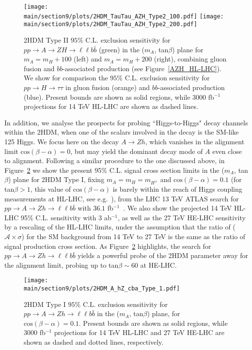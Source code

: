 \begin{figure}[h!]
\begin{center}
\texttt{[image: \\main/section9/plots/2HDM\_TauTau\_AZH\_Type2\_100.pdf]}
\hspace{3mm}
\texttt{[image: \\main/section9/plots/2HDM\_TauTau\_AZH\_Type2\_200.pdf]}
\caption{\small 2HDM Type II $95\%$ C.L. exclusion sensitivity for $p p \to A \to Z H \to \ell\ell b \bar{b}$  (green)
in the ($m_{A}$, tan$\beta$) plane for $m_A = m_H +100$ \UGeV (left) and $m_A = m_H +200$ \UGeV (right), combining 
gluon fusion and $bb$-associated production (see Figure~\ref{AZH_HL-LHC}). We show for comparison
the $95\%$ C.L. exclusion sensitivity for $p p \to H \to \tau\tau$ in gluon fusion (orange) 
and $bb$-associated production (blue). Present bounds are shown as solid regions, while $3000$ fb$^{-1}$ projections for 14 TeV HL-LHC are shown as dashed lines.}
\label{TauTau_AZH_HL-HE}
\end{center}
\end{figure}

In addition, we analyse the prospects for probing ``Higgs-to-Higgs" decay channels within the 2HDM, when one of the scalars involved in the decay is the SM-like 125 \UGeV Higgs. We focus here on the decay $A \to Z h$, which vanishes in the alignment limit $\mathrm{cos}(\beta - \alpha) = 0$, but may yield the dominant decay mode of $A$ even close to alignment. Following a similar procedure to the one discussed above, in Figure~\ref{A_hZ_HL-HE} we show the present 95$\%$ C.L. signal cross section limits in the ($m_{A}$, tan$\beta$) plane for 2HDM Type I, fixing $m_A = m_H = m_{H^{\pm}}$ and $\mathrm{cos}(\beta-\alpha) = 0.1$ (for tan$\beta > 1$, this value of $\mathrm{cos}(\beta-\alpha)$ is barely within the reach of Higgs coupling measurements at HL-LHC, see e.g.~\cite{ATL-PHYS-PUB-2014-017}), from the LHC 13 TeV ATLAS search for $p p \to A \to Z h \to \ell\ell b \bar{b}$ with $36.1$ fb$^{-1}$~\cite{Aaboud:2017cxo}. We also show the projected 14 TeV HL-LHC 95$\%$ C.L. sensitivity with $3$ ab$^{-1}$, as well as the 27 TeV HE-LHC sensitivity by a rescaling of the HL-LHC limits, under the assumption that the ratio of ($\mathcal{A} \times \sigma$) for the SM background from 14 TeV to 27 TeV is the same as the ratio of signal production cross section.
As Figure~\ref{A_hZ_HL-HE} highlights, the search for $p p \to A \to Z h \to \ell\ell b \bar{b}$ yields a powerful probe of the 2HDM parameter away for the alignment limit, probing up to tan$\beta \sim 60$ at HE-LHC.

\begin{figure}[h!]
\begin{center}
\texttt{[image: \\main/section9/plots/2HDM\_A\_hZ\_cba\_Type\_1.pdf]}
\caption{\small 2HDM Type I $95\%$ C.L. exclusion sensitivity for $p p \to A \to Z h \to \ell\ell b \bar{b}$ 
in the ($m_{A}$, tan$\beta$) plane, for $\mathrm{cos}(\beta-\alpha) = 0.1$. 
Present bounds are shown as solid regions, while $3000$ fb$^{-1}$ projections for 14 TeV HL-LHC and 27 TeV HE-LHC
are shown as dashed and dotted lines, respectively.}
\label{A_hZ_HL-HE}
\end{center}
\end{figure}


